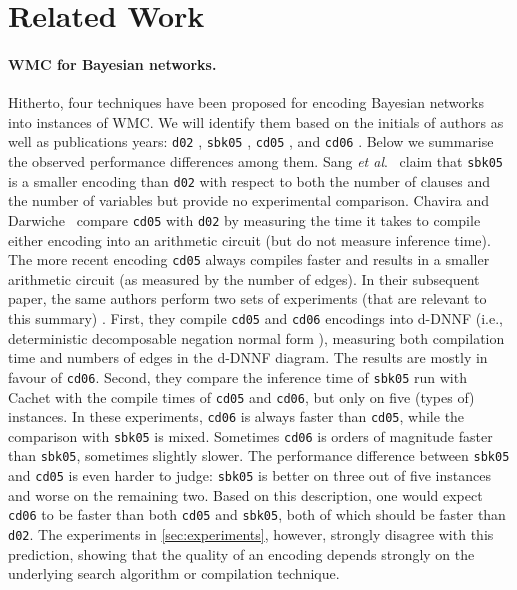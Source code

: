 \documentclass{article}
\newcommand{\etal}{\textit{et al}.}
\begin{document}
\section{Related Work} \label{sec:related}

\paragraph{WMC for Bayesian networks.} Hitherto, four techniques have been
proposed for encoding Bayesian networks into instances of WMC. We will identify
them based on the initials of authors as well as publications years:
\texttt{d02} \cite{DBLP:conf/kr/Darwiche02}, \texttt{sbk05}
\cite{DBLP:conf/aaai/SangBK05}, \texttt{cd05} \cite{DBLP:conf/ijcai/ChaviraD05},
and \texttt{cd06} \cite{DBLP:conf/sat/ChaviraD06}. Below we summarise the
observed performance differences among them. Sang
\etal{}~ claim that \texttt{sbk05} is a
smaller encoding than \texttt{d02} with respect to both the number of clauses
and the number of variables but provide no experimental comparison. Chavira and
Darwiche~ compare \texttt{cd05} with
\texttt{d02} by measuring the time it takes to compile either encoding into an
arithmetic circuit (but do not measure inference time). The more recent encoding
\texttt{cd05} always compiles faster and results in a smaller arithmetic circuit
(as measured by the number of edges). In their subsequent paper, the same
authors perform two sets of experiments (that are relevant to this summary)
\cite{DBLP:conf/sat/ChaviraD06}. First, they compile \texttt{cd05} and
\texttt{cd06} encodings into d-DNNF (i.e., deterministic decomposable negation
normal form \cite{DBLP:journals/jancl/Darwiche01}), measuring both compilation
time and numbers of edges in the d-DNNF diagram. The results are mostly in
favour of \texttt{cd06}. Second, they compare the inference time of
\texttt{sbk05} run with Cachet \cite{DBLP:conf/sat/SangBBKP04} with the compile
times of \texttt{cd05} and \texttt{cd06}, but only on five (types of) instances.
In these experiments, \texttt{cd06} is always faster than \texttt{cd05}, while
the comparison with \texttt{sbk05} is mixed. Sometimes \texttt{cd06} is orders
of magnitude faster than \texttt{sbk05}, sometimes slightly slower. The
performance difference between \texttt{sbk05} and \texttt{cd05} is even harder
to judge: \texttt{sbk05} is better on three out of five instances and worse on
the remaining two. Based on this description, one would expect \texttt{cd06} to
be faster than both \texttt{cd05} and \texttt{sbk05}, both of which should be
faster than \texttt{d02}. The experiments in \cref{sec:experiments}, however,
strongly disagree with this prediction, showing that the quality of an encoding
depends strongly on the underlying search algorithm or compilation technique.
\end{document}

